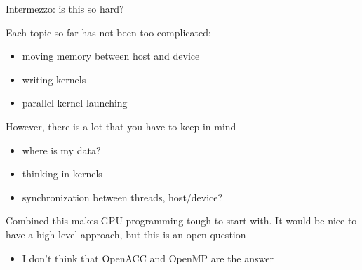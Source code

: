 \begin{frame}[fragile]{Intermezzo: is this so hard?}
    \begin{info}{}
        Each topic so far has not been too complicated:
        \begin{itemize}
            \item moving memory between host and device
            \item writing kernels
            \item parallel kernel launching
        \end{itemize}
        However, there is a lot that you have to keep in mind
        \begin{itemize}
            \item where is my data?
            \item thinking in kernels
            \item synchronization between threads, host/device?
        \end{itemize}
        Combined this makes GPU programming tough to start with.
        It would be nice to have a high-level approach, but this is an open question
        \begin{itemize}
            \item I don't think that OpenACC and OpenMP are the answer
        \end{itemize}
    \end{info}

\end{frame}


